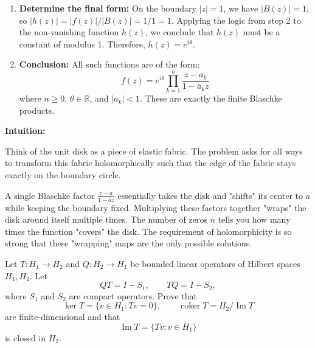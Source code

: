 \begin{solution}
\begin{enumerate}
    \item \textbf{Determine the final form:} On the boundary $|z|=1$, we have $|B(z)| = 1$, so $|h(z)| = |f(z)|/|B(z)| = 1/1 = 1$. Applying the logic from step 2 to the non-vanishing function $h(z)$, we conclude that $h(z)$ must be a constant of modulus 1. Therefore, $h(z) = e^{i\theta}$.
    \item \textbf{Conclusion:} All such functions are of the form:
    \[ f(z) = e^{i\theta} \prod_{k=1}^n \frac{z - a_k}{1 - \bar{a}_k z} \]
    where $n \geq 0$, $\theta \in \mathbb{R}$, and $|a_k| < 1$. These are exactly the finite Blaschke products.
\end{enumerate}
\par\medskip
\textbf{Intuition:}
\par\medskip
Think of the unit disk as a piece of elastic fabric. The problem asks for all ways to transform this fabric holomorphically such that the edge of the fabric stays exactly on the boundary circle. 
\par\medskip
A single Blaschke factor $\frac{z-a}{1-\bar{a}z}$ essentially takes the disk and "shifts" its center to $a$ while keeping the boundary fixed. Multiplying these factors together "wraps" the disk around itself multiple times. The number of zeros $n$ tells you how many times the function "covers" the disk. The requirement of holomorphicity is so strong that these "wrapping" maps are the only possible solutions.
\end{solution}

\begin{exercise}
\label{analysis:2015:5}
Let $T:H_1\to H_2$ and $Q:H_2\to H_1$ be bounded linear operators of Hilbert spaces $H_1,H_2$. Let
\[
QT=I-S_1,\qquad TQ=I-S_2,
\]
where \(S_1\) and \(S_2\) are compact operators. Prove that
\[
\ker T=\{v\in H_1:Tv=0\},\qquad
\operatorname{coker}T=H_2/\operatorname{Im}T
\]
are finite-dimensional and that
\[
\operatorname{Im}T=\{Tv:v\in H_1\}
\]
is closed in \(H_2\).
\end{exercise}

